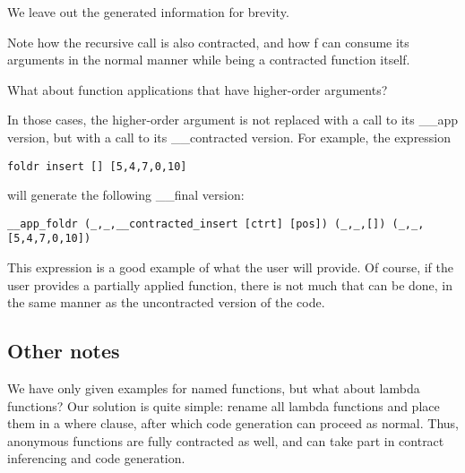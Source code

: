 \documentclass[10pt,a4paper]{article}
\begin{document}
We leave out the generated information for brevity.

Note how the recursive call is also contracted, and how f can consume its arguments in the normal manner while being a contracted function itself.

What about function applications that have higher-order arguments?

In those cases, the higher-order argument is not replaced with a call to its \_\_app version, but with a call to its \_\_contracted version.
For example, the expression

\begin{lstlisting}
foldr insert [] [5,4,7,0,10]
\end{lstlisting}

will generate the following \_\_final version:

\begin{lstlisting}
__app_foldr (_,_,__contracted_insert [ctrt] [pos]) (_,_,[]) (_,_,[5,4,7,0,10])
\end{lstlisting}

This expression is a good example of what the user will provide.
Of course, if the user provides a partially applied function, there is not much that can be done, in the same manner as the uncontracted version of the code.

\subsection{Other notes}
We have only given examples for named functions, but what about lambda functions? Our solution is quite simple: rename all lambda functions and place them in a where clause, after which code generation can proceed as normal.
Thus, anonymous functions are fully contracted as well, and can take part in contract inferencing and code generation.
\end{document}
